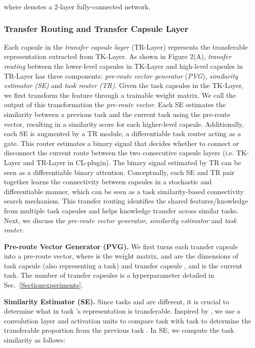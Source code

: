 \documentclass{article}
\begin{document}
where  denotes a 2-layer fully-connected network.







\subsubsection{Transfer Routing and Transfer Capsule Layer}




{Each capsule in the \textit{transfer capsule layer} (TR-Layer) represents the transferable representation extracted from TK-Layer. As shown in Figure 2(A), \textit{transfer routing} between the lower-level capsules in TK-Layer and high-level capsules in TR-Layer has three components: {\textit{pre-route vector generator}} (\textit{PVG}), \textit{similarity estimator (SE)} and \textit{task router (TR)}. Given the task capsules in the TK-Layer, we first transform the feature through a trainable {weight matrix}. We call the output of this transformation the \textit{pre-route vector}. Each SE estimates the similarity between a previous task and the current task using the pre-route vector, resulting in a similarity score for each higher-level capsule. Additionally, each SE is augmented by a TR module, a differentiable task router acting as a gate. This router estimates a binary signal that decides whether to connect or disconnect the current route between the two consecutive capsule layers (i.e. TK-Layer and TR-Layer in CL-plugin). The binary signal estimated by TR can be seen as 
a differentiable binary attention. Conceptually, each SE and TR pair together learns the connectivity between capsules in a stochastic and differentiable manner, which can be seen as a task similarity-based connectivity search mechanism. This transfer routing identifies the shared features/knowledge from multiple task capsules and helps knowledge transfer across similar tasks. 
Next, we discuss the {\textit{pre-route vector generator}}, \textit{similarity estimator} and \textit{task router}.



{\textbf{Pre-route Vector Generator (PVG).}}
We first turns each transfer capsule  into a pre-route {vector}, 
where  is the weight matrix,  and  are the dimensions of task capsule  (also representing a task) and transfer capsule , and  is the current task. The number of transfer capsules  is a hyperparameter detailed in Sec.~\ref{Sectionexperiments}.

\textbf{Similarity Estimator (SE).}
Since tasks  and  are different, it is crucial to determine what in task 's representation is transferable. Inspired by \cite{DBLP:conf/acl/LiX18}, we use a convolution layer and activation units to compare task  with task  to determine the transferable proportion from the previous task . In SE, we compute the task similarity as follows: 

}
\end{document}
